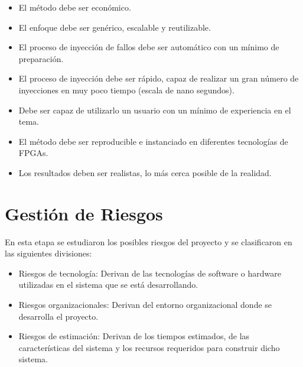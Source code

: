 \documentclass[a4paper,openright,12pt]{report}
\begin{document}
\begin{itemize}

\item El método debe ser económico.
\item El enfoque debe ser genérico, escalable y reutilizable.
\item El proceso de inyección de fallos debe ser automático con un mínimo de preparación.
\item El proceso de inyección debe ser rápido, capaz de realizar un gran número de inyecciones en muy poco tiempo (escala de nano segundos).
\item Debe ser capaz de utilizarlo un usuario con un mínimo de experiencia en el tema.
\item El método debe  ser reproducible e instanciado en diferentes tecnologías de FPGAs.
\item Los resultados deben ser realistas, lo más cerca posible de la realidad.




\end{itemize}


\section{Gestión de Riesgos}


En esta etapa se estudiaron los posibles riesgos del proyecto y se clasificaron en las siguientes divisiones:
\begin{itemize}
\item Riesgos de tecnología: Derivan de las tecnologías de software o hardware utilizadas en el sistema que se está desarrollando.
\item Riesgos organizacionales: Derivan del entorno organizacional donde se desarrolla el proyecto.
\item Riesgos de estimación: Derivan de los tiempos estimados, de las características del sistema y los recursos requeridos para construir dicho sistema.
\end{itemize}
\end{document}
